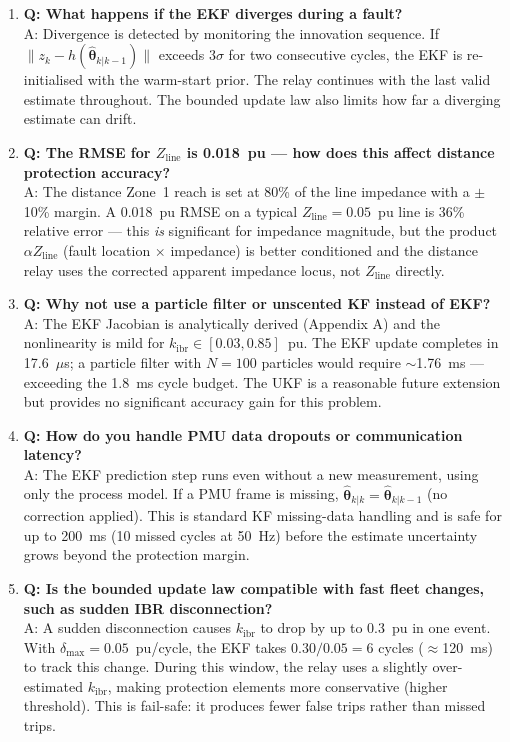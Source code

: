 \documentclass[12pt,a4paper]{article}
\begin{document}
\begin{enumerate}
\item \textbf{Q: What happens if the EKF diverges during a fault?}\\
      A: Divergence is detected by monitoring the innovation sequence. If
      $\|z_k - h(\hat{\boldsymbol{\theta}}_{k|k-1})\|$ exceeds $3\sigma$ for
      two consecutive cycles, the EKF is re-initialised with the warm-start
      prior. The relay continues with the last valid estimate throughout.
      The bounded update law also limits how far a diverging estimate can drift.

\item \textbf{Q: The RMSE for $Z_\mathrm{line}$ is 0.018~pu — how does this
      affect distance protection accuracy?}\\
      A: The distance Zone~1 reach is set at 80\% of the line impedance with a
      $\pm$10\% margin. A 0.018~pu RMSE on a typical $Z_\mathrm{line} = 0.05$~pu
      line is 36\% relative error — this \emph{is} significant for impedance
      magnitude, but the product $\alpha Z_\mathrm{line}$ (fault location $\times$
      impedance) is better conditioned and the distance relay uses the corrected
      apparent impedance locus, not $Z_\mathrm{line}$ directly.

\item \textbf{Q: Why not use a particle filter or unscented KF instead of EKF?}\\
      A: The EKF Jacobian is analytically derived (Appendix A) and the nonlinearity
      is mild for $k_\mathrm{ibr} \in [0.03, 0.85]$~pu. The EKF update completes in
      17.6~$\mu$s; a particle filter with $N=100$ particles would require
      $\sim$1.76~ms — exceeding the 1.8~ms cycle budget. The UKF is a reasonable
      future extension but provides no significant accuracy gain for this problem.

\item \textbf{Q: How do you handle PMU data dropouts or communication latency?}\\
      A: The EKF prediction step runs even without a new measurement, using only the
      process model. If a PMU frame is missing, $\hat{\boldsymbol{\theta}}_{k|k}
      = \hat{\boldsymbol{\theta}}_{k|k-1}$ (no correction applied). This is standard
      KF missing-data handling and is safe for up to 200~ms (10 missed cycles at
      50~Hz) before the estimate uncertainty grows beyond the protection margin.

\item \textbf{Q: Is the bounded update law compatible with fast fleet changes,
      such as sudden IBR disconnection?}\\
      A: A sudden disconnection causes $k_\mathrm{ibr}$ to drop by up to 0.3~pu
      in one event. With $\delta_\mathrm{max} = 0.05$~pu/cycle, the EKF takes
      $0.30/0.05 = 6$ cycles ($\approx$120~ms) to track this change. During this
      window, the relay uses a slightly over-estimated $k_\mathrm{ibr}$, making
      protection elements more conservative (higher threshold). This is fail-safe:
      it produces fewer false trips rather than missed trips.
\end{enumerate}
\end{document}
